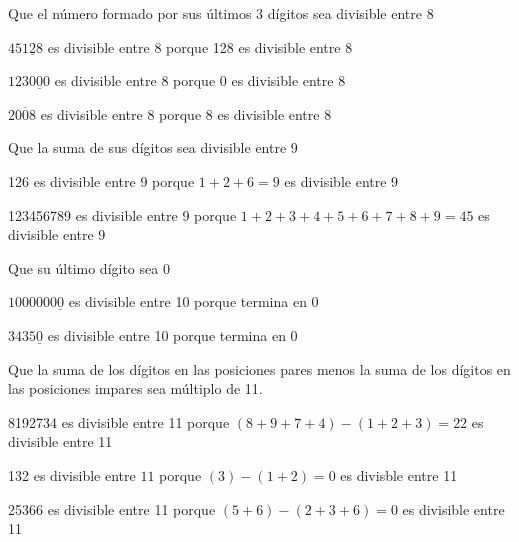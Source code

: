 \documentclass[11pt]{scrartcl}
\begin{document}
\begin{criterio*}
    Que el número formado por sus últimos 3 dígitos sea divisible entre 8
\end{criterio*}
\begin{ejemplo*}
    $45\underline{128}$ es divisible entre 8 porque 128 es divisible entre 8
\end{ejemplo*}
\begin{ejemplo*}
    $123\underline{000}$ es divisible entre 8 porque 0 es divisible entre 8
    \end{ejemplo*}
    \begin{ejemplo*}
    $2\overline{008}$ es divisible entre 8 porque 8 es divisible entre 8
\end{ejemplo*}
\begin{criterio*}
    Que la suma de sus dígitos sea divisible entre 9
\end{criterio*}
\begin{ejemplo*}
    126 es divisible entre 9 porque $1+2+6=9$ es divisible entre 9
\end{ejemplo*}
\begin{ejemplo*}
     123456789 es divisible entre 9 porque $1+2+3+4+5+6+7+8+9=45$ es divisible entre 9
\end{ejemplo*}
\begin{criterio*}
    Que su último dígito sea 0
\end{criterio*}
\begin{ejemplo*}
    $1000000\underline{0}$ es divisible entre 10 porque termina en 0
\end{ejemplo*}
\begin{ejemplo*}
    $3435\underline{0}$ es divisible entre 10 porque termina en 0
\end{ejemplo*}
\begin{criterio*}
    Que la suma de los dígitos en las posiciones pares menos la suma de los
dígitos en las posiciones impares sea múltiplo de 11.

\end{criterio*}
\begin{ejemplo*}
    8192734 es divisible entre 11 porque $(8+9+7+4)-(1+2+3)=22$ es divisible entre 11
\end{ejemplo*}
\begin{ejemplo*}
    132 es divisible entre $11$ porque $(3)-(1+2)=0$ es divisble entre 11
\end{ejemplo*}
\begin{ejemplo*}
    25366 es divisible entre 11 porque $(5+6)-(2+3+6)=0$ es divisible entre 11
\end{ejemplo*}
\end{document}
